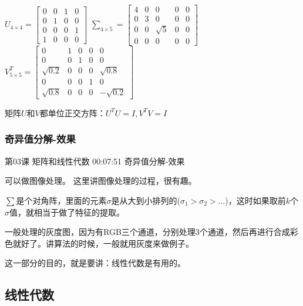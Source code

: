 \documentclass[UTF8]{ctexbook}
\begin{document}
$U_{4 \times 4}=
\begin{bmatrix}
0 & 0 & 1 & 0 \\
0 & 1 & 0 & 0 \\
0 & 0 & 0 & 1 \\
1 & 0 & 0 & 0
\end{bmatrix}$ \quad
$\sum_{4 \times 5}=
\begin{bmatrix}
4 & 0 & 0 & 0 & 0 \\
0 & 3 & 0 & 0 & 0 \\
0 & 0 & \sqrt{5} & 0 & 0 \\
0 & 0 & 0 & 0 & 0
\end{bmatrix}$\quad
$V_{5 \times 5}^{T}=
\begin{bmatrix}
0 & 1 & 0 & 0 & 0 \\
0 & 0 & 1 & 0 & 0 \\
\sqrt{0.2} & 0 & 0 & 0 & \sqrt{0.8} \\
0 & 0 & 0 & 1 & 0 \\
\sqrt{0.8} & 0 & 0 & 0 & -\sqrt{0.2 }
\end{bmatrix}$\quad

矩阵$U$和$V$都单位正交方阵：$U^{T}U=I,V^{T}V=I$



\subsubsection{奇异值分解-效果}

第03课 矩阵和线性代数 00:07:51 奇异值分解-效果

可以做图像处理。 这里讲图像处理的过程，很有趣。

$\sum$是个对角阵，里面的元素$\sigma$是从大到小排列的($\sigma_{1} > \sigma_{2} > \dots$)，这时如果取前$k$个$\sigma$值，就相当于做了特征的提取。

一般处理的灰度图，因为有RGB三个通道，分别处理3个通道，然后再进行合成彩色就好了。讲算法的时候，一般就用灰度来做例子。

这一部分的目的，就是要讲：线性代数是有用的。

\subsection{线性代数}
\end{document}
